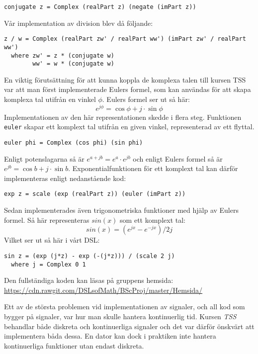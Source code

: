 \documentclass[]{article}
\begin{document}
\begin{verbatim}
conjugate z = Complex (realPart z) (negate (imPart z))
\end{verbatim}
Vår implementation av division blev då följande:
\begin{verbatim}
z / w = Complex (realPart zw' / realPart ww') (imPart zw' / realPart ww')
  where zw' = z * (conjugate w)
        ww' = w * (conjugate w)
\end{verbatim}

En viktig förutsättning för att kunna koppla de komplexa talen till kursen TSS var att man först
implementerade Eulers formel, som kan användas för att skapa komplexa tal utifrån en vinkel $\phi$. Eulers
formel ser ut så här:
\[e^{j\phi}=\cos \phi+ j \cdot \sin \phi \]
Implementationen av den här representationen skedde i flera steg.
Funktionen \texttt{euler} skapar ett komplext tal utifrån en
given vinkel, representerad av ett flyttal.
\begin{verbatim}
euler phi = Complex (cos phi) (sin phi)
\end{verbatim}
Enligt potenslagarna%
så är \(e^{a+jb} = e^{a} \cdot e^{jb}\) och enligt Eulers formel så är
\(e^{j b} = \cos b + j\cdot \sin b\).
%
Exponentialfunktionen för ett komplext tal kan därför implementeras
enligt nedanstående kod:

\begin{verbatim}
exp z = scale (exp (realPart z)) (euler (imPart z))
\end{verbatim}
Sedan implementerades även trigonometriska funktioner med hjälp av Eulers
formel. Så här representeras $sin(x)$ som ett komplext tal:
\[ sin(x) = (e^{j x} - e^{-j x}) / 2 j \]
Vilket ser ut så här i vårt DSL:
\begin{verbatim}
sin z = (exp (j*z) - exp (-(j*z))) / (scale 2 j)
  where j = Complex 0 1
\end{verbatim}

Den fullständiga koden kan läsas på gruppens hemsida:
\url{https://cdn.rawgit.com/DSLsofMath/BScProj/master/Hemsida/}

Ett av de största problemen vid implementationen av signaler, och all kod som bygger på signaler, var hur man
skulle hantera kontinuerlig tid. Kursen \textit{TSS} behandlar både diskreta och kontinuerliga signaler och det var
därför önskvärt att implementera båda dessa. En dator kan dock i praktiken inte hantera kontinuerliga funktioner utan
endast diskreta.
\end{document}
